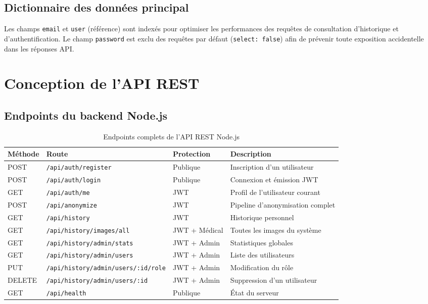 \subsection{Dictionnaire des données principal}

Les champs \texttt{email} et \texttt{user} (référence) sont indexés pour optimiser les performances des requêtes de consultation d'historique et d'authentification. Le champ \texttt{password} est exclu des requêtes par défaut (\texttt{select: false}) afin de prévenir toute exposition accidentelle dans les réponses API.

\section{Conception de l'API REST}

\subsection{Endpoints du backend Node.js}

\begin{table}[H]
\centering
\caption{Endpoints complets de l'API REST Node.js}
\label{tab:endpoints_nodejs}
\begin{tabularx}{\textwidth}{p{1.5cm} p{5cm} p{2cm} X}
\toprule
\textbf{Méthode} & \textbf{Route} & \textbf{Protection} & \textbf{Description} \\
\midrule
POST & \texttt{/api/auth/register}          & Publique         & Inscription d'un utilisateur \\
POST & \texttt{/api/auth/login}             & Publique         & Connexion et émission JWT \\
GET  & \texttt{/api/auth/me}               & JWT              & Profil de l'utilisateur courant \\
POST & \texttt{/api/anonymize}             & JWT              & Pipeline d'anonymisation complet \\
GET  & \texttt{/api/history}               & JWT              & Historique personnel \\
GET  & \texttt{/api/history/images/all}    & JWT + Médical    & Toutes les images du système \\
GET  & \texttt{/api/history/admin/stats}   & JWT + Admin      & Statistiques globales \\
GET  & \texttt{/api/history/admin/users}   & JWT + Admin      & Liste des utilisateurs \\
PUT  & \texttt{/api/history/admin/users/:id/role} & JWT + Admin & Modification du rôle \\
DELETE & \texttt{/api/history/admin/users/:id} & JWT + Admin   & Suppression d'un utilisateur \\
GET  & \texttt{/api/health}               & Publique         & État du serveur \\
\bottomrule
\end{tabularx}
\end{table}

